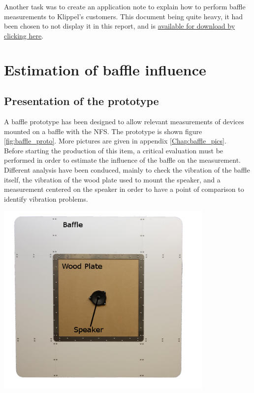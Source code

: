 \documentclass{report}
\begin{document}
Another task was to create an application note to explain how to perform baffle measurements to Klippel's customers. This document being quite heavy, it had been chosen to not display it in this report, and is \href{https://www.dropbox.com/s/px1e5jnn0nc5rfs/AN_00_Baffle_Measurement.pdf?dl=0}{available for download by clicking \underline{here}}.

\section{Estimation of baffle influence}

\subsection{Presentation of the prototype}

\begin{minipage}{0.6\textwidth}
A baffle prototype has been designed to allow relevant measurements of devices mounted on a baffle with the NFS. The prototype is shown figure \ref{fig:baffle_proto}. More pictures are given in appendix \ref{Chap:baffle_pics}. \\

Before starting the production of this item, a critical evaluation must be performed in order to estimate the influence of the baffle on the measurement. Different analysis have been conduced, mainly to check the vibration of the baffle itself, the vibration of the wood plate used to mount the speaker, and a measurement centered on the speaker in order to have a point of comparison to identify vibration problems.
\end{minipage}
\begin{minipage}{0.4\textwidth}
\begin{center}
	\includegraphics[width=0.8\textwidth]{GridOpti/Baffle_Alone_2} 
    \captionsetup{hypcap=false} 
	\label{fig:baffle_proto}
\end{center}
\end{minipage} 
\end{document}
